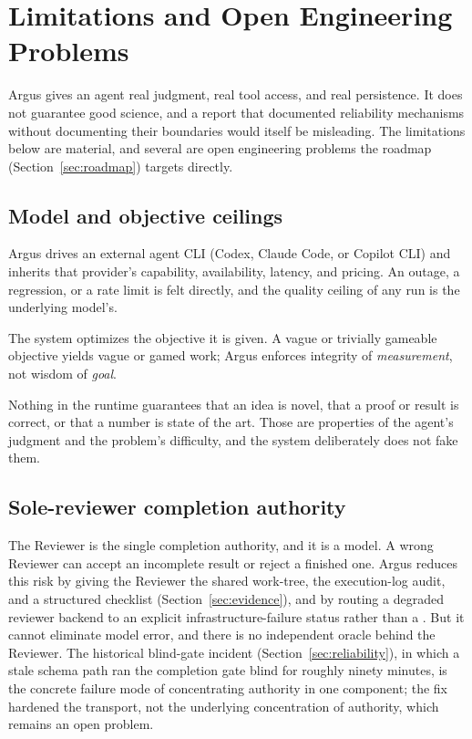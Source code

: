 \section{Limitations and Open Engineering Problems}
\label{sec:limitations}

Argus gives an agent real judgment, real tool access, and real persistence. It
does not guarantee good science, and a report that documented reliability
mechanisms without documenting their boundaries would itself be misleading. The
limitations below are material, and several are open engineering problems the
roadmap (Section~\ref{sec:roadmap}) targets directly.

\subsection{Model and objective ceilings}

\begin{description}[leftmargin=1.4em, style=nextline]
  \item[Provider dependence.] Argus drives an external agent CLI (Codex, Claude
    Code, or Copilot CLI) and inherits that provider's capability, availability,
    latency, and pricing. An outage, a regression, or a rate limit is felt
    directly, and the quality ceiling of any run is the underlying model's.
  \item[Objective quality is the operator's.] The system optimizes the objective
    it is given. A vague or trivially gameable objective yields vague or gamed
    work; Argus enforces integrity of \emph{measurement}, not wisdom of
    \emph{goal}.
  \item[No guarantee of novelty, correctness, or SOTA.] Nothing in the runtime
    guarantees that an idea is novel, that a proof or result is correct, or that a
    number is state of the art. Those are properties of the agent's judgment and
    the problem's difficulty, and the system deliberately does not fake them.
\end{description}

\subsection{Sole-reviewer completion authority}

The Reviewer is the single completion authority, and it is a model. A wrong
Reviewer can accept an incomplete result or reject a finished one. Argus reduces
this risk by giving the Reviewer the shared work-tree, the execution-log audit, and
a structured checklist (Section~\ref{sec:evidence}), and by routing a degraded
reviewer backend to an explicit infrastructure-failure status rather than a
. But it cannot eliminate model error, and there is no independent
oracle behind the Reviewer. The historical blind-gate incident
(Section~\ref{sec:reliability}), in which a stale schema path ran the completion
gate blind for roughly ninety minutes, is the concrete failure mode of concentrating
authority in one component; the fix hardened the transport, not the underlying
concentration of authority, which remains an open problem.

